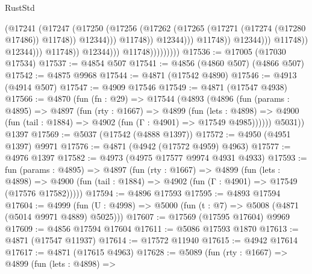 \begin{lexlean}{RustStd}
\begin{coremodule}
                                                          (@17241
                                                            (@17247
                                                              (@17250
                                                                (@17256
                                                                  (@17262
                                                                    (@17265
                                                                      (@17271
                                                                        (@17274 (@17280 @17486))
                                                                        @11748))
                                                                    @12344)))
                                                              @11748))
                                                          @12344)))
                                                    @11748))
                                                @12344)))
                                          @11748))
                                      @12344)))
                                @11748))
                            @12344)))
                      @11748)))))))))
@17536 := @17005 (@17030 @17534)
@17537 := @4854 @507
@17541 := @4856 (@4860 @507) (@4866 @507)
@17542 := @4875 @9968
@17544 := @4871 (@17542 @4890)
@17546 := @4913 (@4914 @507)
@17547 := @4909 @17546
@17549 := @4871 (@17547 @4938)
@17566 := @4870
    (fun (fn : @29) =>
    @17544
      (@4893
        (@4896
          (fun (params : @4895) =>
          @4897
            (fun (rty : @1667) =>
            @4899
              (fun (lets : @4898) =>
              @4900 (fun (tail : @1884) => @4902 (fun (Γ : @4901) => @17549 @4985))))))
        @5031))
    @1397
@17569 := @5037 (@17542 (@4888 @1397))
@17572 := @4950 (@4951 @1397) @9971
@17576 := @4871 (@4942 (@17572 @4959) @4963)
@17577 := @4976 @1397
@17582 := @4973 (@4975 @17577 @9974 @4931 @4933)
@17593 := fun (params : @4895) =>
  @4897
    (fun (rty : @1667) =>
    @4899
      (fun (lets : @4898) =>
      @4900 (fun (tail : @1884) => @4902 (fun (Γ : @4901) => @17549 (@17576 @17582)))))
@17594 := @4896 @17593
@17595 := @4893 @17594
@17604 := @4999 (fun (U : @4998) => @5000 (fun (t : @7) => @5008 (@4871 (@5014 @9971 @4889) @5025)))
@17607 := @17569 (@17595 @17604) @9969
@17609 := @4856 @17594 @17604
@17611 := @5086 @17593 @1870
@17613 := @4871 (@17547 @11937)
@17614 := @17572 @11940
@17615 := @4942 @17614
@17617 := @4871 (@17615 @4963)
@17628 := @5089
    (fun (rty : @1667) =>
    @4899
      (fun (lets : @4898) =>

\end{coremodule}
\end{lexlean}

